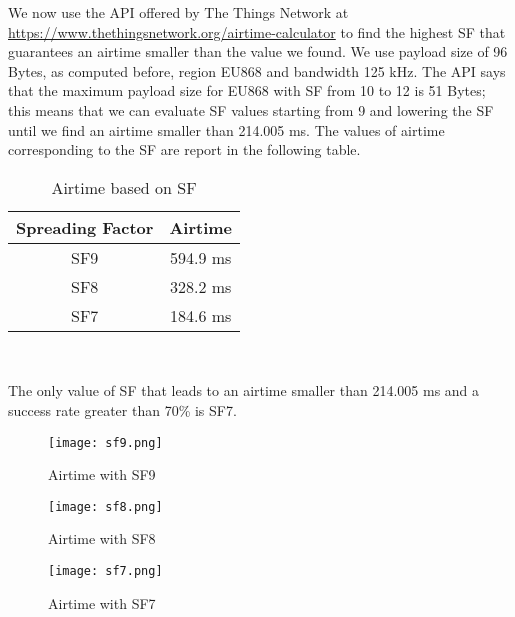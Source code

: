 We now use the API offered by The Things Network at {\color{blue}\url{https://www.thethingsnetwork.org/airtime-calculator}} to find the highest SF that guarantees an airtime smaller than the value we found. We use payload size of 96 Bytes, as computed before, region EU868 and bandwidth 125 kHz. The API says that the maximum payload size for EU868 with SF from 10 to 12 is 51 Bytes; this means that we can evaluate SF values starting from 9 and lowering the SF until we find an airtime smaller than 214.005 ms.
The values of airtime corresponding to the SF are report in the following table.

\begin{table}[H]
\centering 
\begin{tabular}{| c | c |}
	\hline 
	\rowcolor{bluepoli!40}
	\textbf{Spreading Factor} & \textbf{Airtime}\T\B \\
	\hline 
	SF9 & 594.9 ms \T\B\\
	SF8  & 328.2 ms \T\B\\
	SF7 & 184.6 ms \T\B\\
	\hline
\end{tabular}
\\[10pt]
\caption{Airtime based on SF}
\end{table}

The only value of SF that leads to an airtime smaller than 214.005 ms and a success rate greater than 70\% is SF7.

\begin{figure}[H]
    \centering
    \texttt{[image: sf9.png]}
    \caption{Airtime with SF9}
\end{figure}

\begin{figure}[H]
    \centering
    \texttt{[image: sf8.png]}
    \caption{Airtime with SF8}
\end{figure}

\begin{figure}[H]
    \centering
    \texttt{[image: sf7.png]}
    \caption{Airtime with SF7}
\end{figure}




